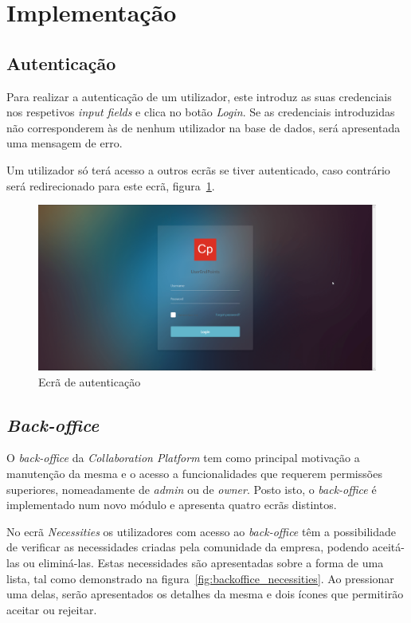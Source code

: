 \newpage

\section{Implementação}\label{sec:implementacao}

\subsection{Autenticação}\label{subsec:implementacao:login}

Para realizar a autenticação de um utilizador, este introduz as suas credenciais nos respetivos \textit{input fields} e clica no botão \textit{Login}.
Se as credenciais introduzidas não corresponderem às de nenhum utilizador na base de dados, será apresentada uma mensagem de erro.
\par
Um utilizador só terá acesso a outros ecrãs se tiver autenticado, caso contrário será redirecionado para este ecrã, figura~\ref{fig:LoginScreen}.

\begin{figure}[H]
  \centering 
  \includegraphics[scale=0.35]{figures/LoginScreen.png}
  \caption{Ecrã de autenticação}\label{fig:LoginScreen}
\end{figure}

\newpage

\subsection{\textit{Back-office}}\label{subsec:implementacao:back-office}

O \textit{back-office} da \textit{Collaboration Platform} tem como principal motivação a manutenção da mesma e o acesso a funcionalidades que requerem permissões superiores, nomeadamente de \textit{admin} ou de \textit{owner}.
Posto isto, o \textit{back-office} é implementado num novo módulo e apresenta quatro ecrãs distintos. 
\par
No ecrã \textit{Necessities} os utilizadores com acesso ao \textit{back-office} têm a possibilidade de verificar as necessidades criadas pela comunidade da empresa, podendo aceitá-las ou eliminá-las. 
Estas necessidades são apresentadas sobre a forma de uma lista, tal como demonstrado na figura~\ref{fig:backoffice_necessities}. Ao pressionar uma delas, serão apresentados os detalhes da mesma e dois ícones que permitirão aceitar ou rejeitar. 

